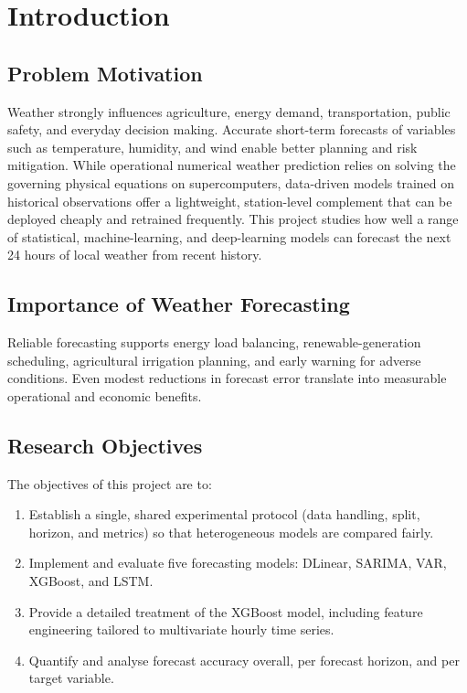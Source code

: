 \documentclass[12pt,a4paper,oneside]{report}
\begin{document}
\tableofcontents
\listoffigures
\listoftables

\clearpage
{}

\chapter{Introduction}
\label{ch:intro}

\section{Problem Motivation}
Weather strongly influences agriculture, energy demand, transportation, public
safety, and everyday decision making. Accurate short-term forecasts of variables
such as temperature, humidity, and wind enable better planning and risk
mitigation. While operational numerical weather prediction relies on solving the
governing physical equations on supercomputers, data-driven models trained on
historical observations offer a lightweight, station-level complement that can be
deployed cheaply and retrained frequently. This project studies how well a range
of statistical, machine-learning, and deep-learning models can forecast the next
24 hours of local weather from recent history.

\section{Importance of Weather Forecasting}
Reliable forecasting supports energy load balancing, renewable-generation
scheduling, agricultural irrigation planning, and early warning for adverse
conditions. Even modest reductions in forecast error translate into measurable
operational and economic benefits.

\section{Research Objectives}
The objectives of this project are to:
\begin{enumerate}
  \item Establish a single, shared experimental protocol (data handling, split,
        horizon, and metrics) so that heterogeneous models are compared fairly.
  \item Implement and evaluate five forecasting models: DLinear, SARIMA, VAR,
        XGBoost, and LSTM.
  \item Provide a detailed treatment of the XGBoost model, including feature
        engineering tailored to multivariate hourly time series.
  \item Quantify and analyse forecast accuracy overall, per forecast horizon,
        and per target variable.
\end{enumerate}
\end{document}
